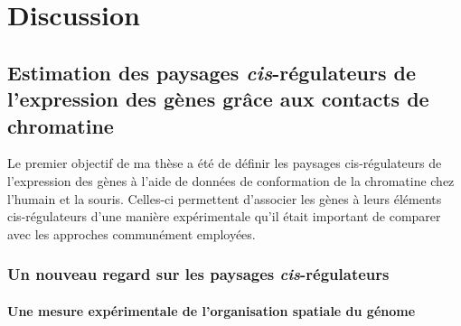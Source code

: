 \chapter{Discussion}
{\hypersetup{linkcolor=GREYDARK}\minitoc}
\label{chap:discussion}

\section{Estimation des paysages \textit{cis}-régulateurs de l’expression des gènes grâce aux contacts de chromatine}

Le premier objectif de ma thèse a été de définir les paysages \gls{cis}-régulateurs de l'expression des gènes à l'aide de données de conformation de la chromatine chez l'humain et la souris. Celles-ci permettent d'associer les gènes à leurs éléments \gls{cis}-régulateurs d'une manière expérimentale qu'il était important de comparer avec les approches communément employées. 

\subsection{Un nouveau regard sur les paysages \textit{cis}-régulateurs}
\subsubsection*{Une mesure expérimentale de l’organisation spatiale du génome}


